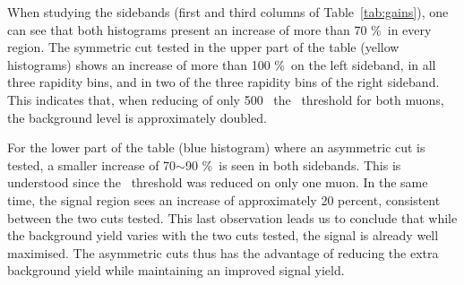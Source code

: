 When studying the sidebands (first and third columns of
Table~\ref{tab:gains}), one can see that both histograms present
an increase of more than 70 \%\ in every region. The symmetric
cut tested in the upper part of the table (yellow histograms) shows an
increase of more than 100 \%\ on the left
sideband, in all three rapidity bins, and in two of the three rapidity bins of the right sideband. This
indicates that, when reducing of only 500 \MeVc\ the \pt\ threshold
for both muons, the background level is approximately doubled.

For the lower part of the table (blue histogram) where an asymmetric
cut is tested, a smaller increase of 70$\sim$90 \%\ is seen in both
sidebands. This is understood since the \pt\ threshold was reduced on
only one muon. In the same time, the
signal region sees an increase of approximately 20 percent,
consistent between the two cuts tested. This last observation leads us
to conclude that while the background yield varies with the two cuts
tested, the signal is already well maximised. The asymmetric cuts thus
has the advantage of reducing the extra background yield while
maintaining an improved signal yield.


